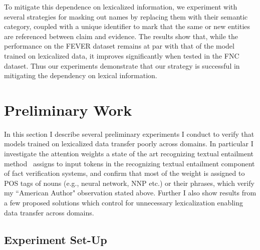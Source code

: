 \documentclass{article}
\begin{document}
{}  To mitigate this dependence on lexicalized information, we experiment with several strategies for masking out names by replacing them with their semantic category, coupled with a unique identifier to mark that the same or new entities are referenced between claim and evidence. The results show that, while the performance on the FEVER dataset remains at par with that of the model trained on lexicalized data, it improves significantly when tested in the FNC dataset. Thus our experiments demonstrate that our strategy is successful in mitigating the dependency on lexical information.


\section{Preliminary Work}


In this section I describe several preliminary experiments I conduct to verify that models trained on lexicalized data transfer poorly across domains. In particular I investigate the attention weights a state of the art recognizing textual entailment method~\citep*{parikh2016decomposable} assigns to input tokens in the recognizing textual entailment component of fact verification systems, and confirm that most of the weight is assigned to POS tags of nouns (e.g., neural network, NNP etc.) or their phrases, which verify my ``American Author" observation stated above. Further I also show results from a few proposed solutions which control for unnecessary lexicalization enabling data transfer across domains.



\subsection{Experiment Set-Up}
 
\end{document}
